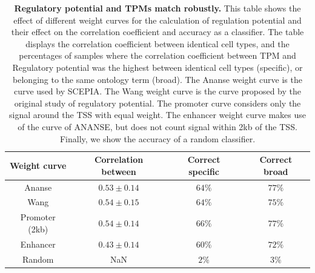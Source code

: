 \begin{table}[H]
    \centering
    \caption{\textbf{Regulatory potential and TPMs match robustly.} This table shows the effect of different weight curves for the calculation of regulation potential and their effect on the correlation coefficient and accuracy as a classifier. The table displays the correlation coefficient between identical cell types, and the percentages of samples where the correlation coefficient between TPM and Regulatory potential was the highest between identical cell types (specific), or belonging to the same ontology term (broad). The Ananse weight curve is the curve used by SCEPIA. The Wang weight curve is the curve proposed by the original study of regulatory potential. The promoter curve considers only the signal around the TSS with equal weight. The enhancer weight curve makes use of the curve of ANANSE, but does not count signal within 2kb of the TSS. Finally, we show the accuracy of a random classifier.}
    \begin{tabular}{||c c c c||} 
        \hline
        \textbf{Weight curve} & \textbf{Correlation between} & \textbf{Correct specific} & \textbf{Correct broad} \\[0.5ex] \hline
        Ananse\cite{Xu_2020}& $0.53 \pm 0.14$ & $64\%$ & $77\%$ \\ \hline
        Wang\cite{Wang2016} & $0.54 \pm 0.15 $ & $64\%$ & $75\%$ \\ \hline
        Promoter (2kb) & $0.54 \pm 0.14$ & $66\%$ & $77\%$ \\ \hline
        Enhancer & $0.43 \pm 0.14$ & $60\%$ & $72\%$ \\ \hline
        Random & NaN & $2\%$ & $3\%$ \\ \hline
    \end{tabular}
    \label{table:correlations}
\end{table}

\begin{table}[H]
    \centering
    \caption{\textbf{SCEPIA output for \textit{MEF2}-family factors}. Correlation table output of SCEPIA run on the whole hHCA dataset, selected for the absolute highest correlating motif for each of the \textit{MEF2} factors.}
    \label{tab:corrtable_SCEPIA}
\end{table}


